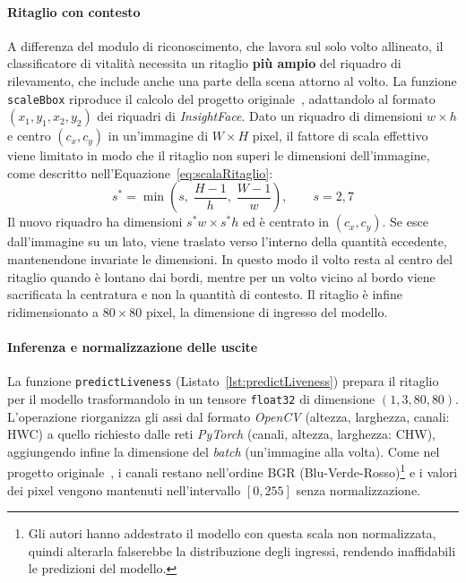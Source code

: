 \paragraph{Ritaglio con contesto}
A differenza del modulo di riconoscimento, che lavora sul solo volto allineato, il classificatore di vitalità necessita un ritaglio \textbf{più ampio} del riquadro di rilevamento, che include anche una parte della scena attorno al volto.
La funzione \texttt{scaleBbox} riproduce il calcolo del progetto originale~\cite{MinivisionaiSilentFaceAntiSpoofing}, adattandolo al formato $(x_1, y_1, x_2, y_2)$ dei riquadri di \textit{InsightFace}.
Dato un riquadro di dimensioni $w \times h$ e centro $(c_x, c_y)$ in un'immagine di $W \times H$ pixel, il fattore di scala effettivo viene limitato in modo che il ritaglio non superi le dimensioni dell'immagine, come descritto nell'Equazione~\eqref{eq:scalaRitaglio}:
\begin{equation}
    \label{eq:scalaRitaglio}
    s^{*} = \min\left( s, \; \frac{H-1}{h}, \; \frac{W-1}{w} \right), \qquad s = 2{,}7
\end{equation}
Il nuovo riquadro ha dimensioni $s^{*}w \times s^{*}h$ ed è centrato in $(c_x, c_y)$.
Se esce dall'immagine su un lato, viene traslato verso l'interno della quantità eccedente, mantenendone invariate le dimensioni.
In questo modo il volto resta al centro del ritaglio quando è lontano dai bordi, mentre per un volto vicino al bordo viene sacrificata la centratura e non la quantità di contesto.
Il ritaglio è infine ridimensionato a $80 \times 80$ pixel, la dimensione di ingresso del modello.

\paragraph{Inferenza e normalizzazione delle uscite}
La funzione \texttt{predictLiveness} (Listato~\ref{lst:predictLiveness}) prepara il ritaglio per il modello trasformandolo in un tensore \texttt{float32} di dimensione $(1, 3, 80, 80)$. 
L'operazione riorganizza gli assi dal formato \textit{OpenCV} (altezza, larghezza, canali: HWC) a quello richiesto dalle reti \textit{PyTorch} (canali, altezza, larghezza: CHW), aggiungendo infine la dimensione del \textit{batch} (un'immagine alla volta).
Come nel progetto originale~\cite{MinivisionaiSilentFaceAntiSpoofing}, i canali restano nell'ordine BGR (Blu-Verde-Rosso)\footnote{Gli autori hanno addestrato il modello con questa scala non normalizzata, quindi alterarla falserebbe la distribuzione degli ingressi, rendendo inaffidabili le predizioni del modello.} e i valori dei pixel vengono mantenuti nell'intervallo $[0, 255]$ senza normalizzazione.

